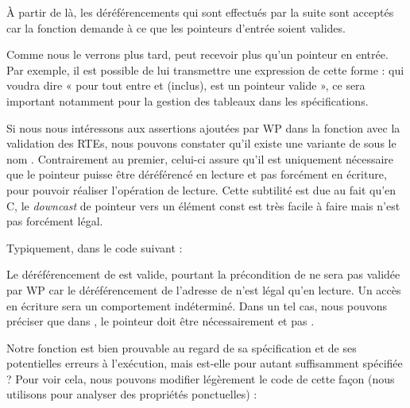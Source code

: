 À partir de là, les déréférencements qui sont effectués par la suite sont 
acceptés car la fonction demande à ce que les pointeurs d'entrée soient 
valides.



Comme nous le verrons plus tard,  peut recevoir plus qu'un 
pointeur en entrée. Par exemple, il est possible de lui transmettre une 
expression de cette forme :  qui voudra dire « pour
tout  entre  et  (inclus),  est un pointeur valide », ce sera important 
notamment pour la gestion des tableaux dans les spécifications.



Si nous nous intéressons aux assertions ajoutées par WP dans la fonction 
avec la validation des RTEs, nous pouvons constater qu'il existe une variante
de  sous le nom . Contrairement au premier, 
celui-ci assure qu'il est uniquement nécessaire que le pointeur puisse
être déréférencé en lecture et pas forcément en écriture, pour pouvoir
réaliser l'opération de lecture. Cette subtilité est due au fait qu'en C, le
\textit{downcast} de pointeur  vers un élément const est très facile à faire mais
n'est pas forcément légal.



Typiquement, dans le code suivant :






Le déréférencement de  est valide, pourtant la précondition de 
ne sera pas validée par WP car le déréférencement de l'adresse de  
n'est légal qu'en lecture. Un accès en écriture sera un comportement 
indéterminé. Dans un tel cas, nous pouvons préciser que dans , le 
pointeur  doit être nécessairement  et pas .





Notre fonction  est bien prouvable au regard de sa spécification et
de ses potentielles erreurs à l'exécution, mais est-elle pour autant 
suffisamment spécifiée ? Pour voir cela, nous pouvons modifier légèrement le code
de cette façon (nous utilisons  pour analyser des propriétés 
ponctuelles) :



